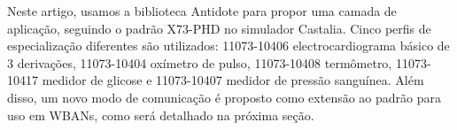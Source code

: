 Neste artigo, usamos a biblioteca Antidote para propor uma camada de aplicação, seguindo o padrão X73-PHD no simulador Castalia. Cinco perfis de especialização diferentes são utilizados: 11073-10406 electrocardiograma básico de 3 derivações, 11073-10404 oxímetro de pulso, 11073-10408 termômetro, 11073-10417 medidor de glicose e 11073-10407 medidor de pressão sanguínea. Além disso, um novo modo de comunicação é proposto como extensão ao padrão para uso em WBANs, como será detalhado na próxima seção.

